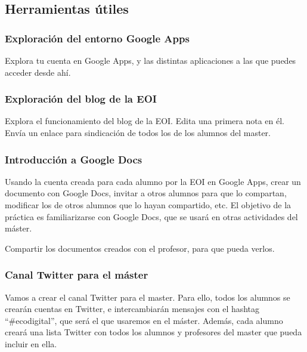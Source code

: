 \documentclass[a4paper,12pt]{article}
\begin{document}
\subsection{Herramientas útiles}

\subsubsection{Exploración del entorno Google Apps}
\label{sub:googleapps}

Explora tu cuenta en Google Apps, y las distintas aplicaciones a las que puedes acceder desde ahí.

\subsubsection{Exploración del blog de la EOI}
\label{sub:blog}

Explora el funcionamiento del blog de la EOI. Edita una primera nota en él. Envía un enlace para sindicación de todos los de los alumnos del master.

\subsubsection{Introducción a Google Docs}
\label{sub:googledocs}

Usando la cuenta creada para cada alumno por la EOI en Google Apps, crear un documento con Google Docs, invitar a otros alumnos para que lo compartan, modificar los de otros alumnos que lo hayan compartido, etc. El objetivo de la práctica es familiarizarse con Google Docs, que se usará en otras actividades del máster.

Compartir los documentos creados con el profesor, para que pueda verlos.

\subsubsection{Canal Twitter para el máster}
\label{sub:canaltwitter}

Vamos a crear el canal Twitter para el master. Para ello, todos los alumnos se crearán cuentas en Twitter, e intercambiarán mensajes con el hashtag ``\#ecodigital'', que será el que usaremos en el máster. Además, cada alumno creará una lista Twitter con todos los alumnos y profesores del master que pueda incluir en ella.
\end{document}
